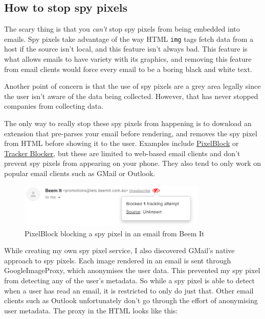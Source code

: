 \documentclass{article}
\begin{document}
\subsection{How to stop spy pixels}

The scary thing is that you \emph{can't} stop spy pixels from being embedded into emails. Spy pixels take advantage of the way HTML \texttt{img} tags fetch data from a host if the source isn't local, and this feature isn't always bad. This feature is what allows emails to have variety with its graphics, and removing this feature from email clients would force every email to be a boring black and white text.

Another point of concern is that the use of spy pixels are a grey area legally since the user isn't aware of the data being collected. However, that has never stopped companies from collecting data.

The only way to really stop these spy pixels from happening is to download an extension that pre-parses your email before rendering, and removes the spy pixel from HTML before showing it to the user. Examples include \href{https://chrome.google.com/webstore/detail/pixelblock/jmpmfcjnflbcoidlgapblgpgbilinlem?hl=en}{PixelBlock} or \href{https://chrome.google.com/webstore/detail/tracker-blocker-stop-trac/okacfeiojkgmcaonaikblpicellplcdn?hl=en}{Tracker Blocker}, but these are limited to web-based email clients and don't prevent spy pixels from appearing on your phone. They also tend to only work on popular email clients such as GMail or Outlook.

\begin{figure}[H]
\centering
\includegraphics[width=0.8\textwidth]{images/beem.png}
\caption{\label{beem}PixelBlock blocking a spy pixel in an email from Beem It}
\end{figure}

While creating my own spy pixel service, I also discovered GMail's native approach to spy pixels. Each image rendered in an email is sent through GoogleImageProxy, which anonymises the user data. This prevented my spy pixel from detecting any of the user's metadata. So while a spy pixel is able to detect when a user has read an email, it is restricted to only do just that. Other email clients such as Outlook unfortunately don't go through the effort of anonymising user metadata. The proxy in the HTML looks like this:
\end{document}
